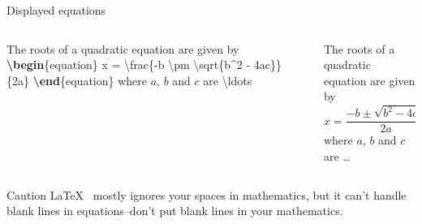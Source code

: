 \documentclass[,aspectratio=43]{beamer}
\newcommand{\VERB}{\Verb[commandchars=\\\{\}]}
\newenvironment{Shaded}{\begin{snugshade}}{\end{snugshade}}
\newcommand{\ExtensionTok}[1]{#1}
\newcommand{\FunctionTok}[1]{\textcolor[rgb]{0.02,0.16,0.49}{#1}}
\newcommand{\KeywordTok}[1]{\textcolor[rgb]{0.00,0.44,0.13}{\textbf{#1}}}
\newcommand{\NormalTok}[1]{#1}
\newcommand{\SpecialCharTok}[1]{\textcolor[rgb]{0.25,0.44,0.63}{#1}}
\newcommand{\SpecialStringTok}[1]{\textcolor[rgb]{0.73,0.40,0.53}{#1}}
\providecommand{\tightlist}{%
  \setlength{\itemsep}{0pt}\setlength{\parskip}{0pt}}
\begin{document}
\begin{frame}[fragile]{Displayed equations}

\begin{columns}[T]
\begin{column}{0.58\textwidth}
\small
\vspace{-1em}

\begin{Shaded}
\begin{Highlighting}[]
\NormalTok{The roots of a quadratic equation are }
\NormalTok{given by}
\KeywordTok{\textbackslash{}begin}\NormalTok{\{}\ExtensionTok{equation}\NormalTok{\}}
\SpecialStringTok{x = }\SpecialCharTok{\textbackslash{}frac}\SpecialStringTok{\{{-}b }\SpecialCharTok{\textbackslash{}pm}\SpecialStringTok{ }\SpecialCharTok{\textbackslash{}sqrt}\SpecialStringTok{\{b\^{}2 {-} 4ac\}\}}
\SpecialStringTok{         \{2a\} }
\KeywordTok{\textbackslash{}end}\NormalTok{\{}\ExtensionTok{equation}\NormalTok{\}}
\NormalTok{where }\SpecialStringTok{$a$}\NormalTok{, }\SpecialStringTok{$b$}\NormalTok{ and }\SpecialStringTok{$c$}\NormalTok{ are }\FunctionTok{\textbackslash{}ldots}
\end{Highlighting}
\end{Shaded}
\end{column}

\begin{column}{0.38\textwidth}
The roots of a quadratic equation are given by \begin{equation}
x = \frac{-b \pm \sqrt{b^2 - 4ac}}
{2a} \end{equation} where \(a\), \(b\) and \(c\) are \ldots
\end{column}
\end{columns}

\vspace{0.5em}

\begin{alertblock}{Caution}
\LaTeX~ mostly ignores your spaces in mathematics, but it can't handle
blank lines in equations--don't put blank lines in your mathematics.

\end{alertblock}
\end{frame}
\end{document}
